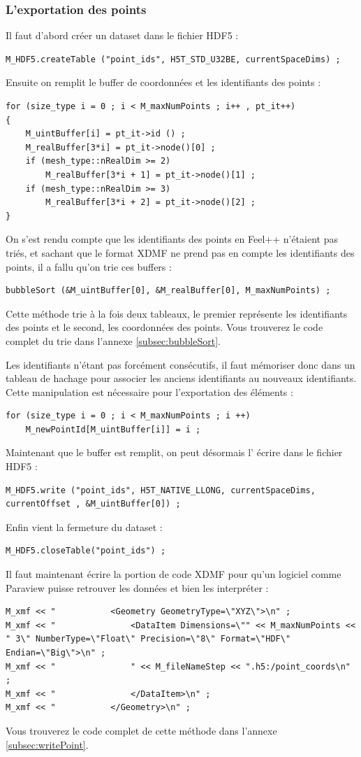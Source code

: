 \documentclass[12pt]{article}
\begin{document}
\subsubsection{L'exportation des points}
\label{subsec:exportationpoint}
\noindent
Il faut d'abord créer un dataset dans le fichier HDF5 :
\begin{lstlisting}
M_HDF5.createTable ("point_ids", H5T_STD_U32BE, currentSpaceDims) ;
\end{lstlisting}
Ensuite on remplit le buffer de coordonnées et les identifiants des points :
\begin{lstlisting}
for (size_type i = 0 ; i < M_maxNumPoints ; i++ , pt_it++) 
{
    M_uintBuffer[i] = pt_it->id () ;
    M_realBuffer[3*i] = pt_it->node()[0] ;
    if (mesh_type::nRealDim >= 2)
        M_realBuffer[3*i + 1] = pt_it->node()[1] ;
    if (mesh_type::nRealDim >= 3)
        M_realBuffer[3*i + 2] = pt_it->node()[2] ;
}
\end{lstlisting}
On s'est rendu compte que les identifiants des points en Feel++ n'étaient pas triés, et sachant que le format XDMF ne prend pas en compte les identifiants des points, il a fallu qu'on trie ces buffers : 
\begin{lstlisting}
bubbleSort (&M_uintBuffer[0], &M_realBuffer[0], M_maxNumPoints) ;
\end{lstlisting}
Cette méthode trie à la fois deux tableaux, le premier représente les identifiants des points et le second, les coordonnées des points.
Vous trouverez le code complet du trie dans l'annexe \ref{subsec:bubbleSort}.

Les identifiants n'étant pas forcément consécutifs, il faut mémoriser donc dans un tableau de hachage pour associer les anciens identifiants au nouveaux identifiants. Cette manipulation est nécessaire pour l'exportation des éléments :
\begin{lstlisting}
for (size_type i = 0 ; i < M_maxNumPoints ; i ++) 
    M_newPointId[M_uintBuffer[i]] = i ;
\end{lstlisting}
Maintenant que le buffer est remplit, on peut désormais l' écrire dans le fichier HDF5 :
\begin{lstlisting}
M_HDF5.write ("point_ids", H5T_NATIVE_LLONG, currentSpaceDims, currentOffset , &M_uintBuffer[0]) ;
\end{lstlisting}
Enfin vient la fermeture du dataset :
\begin{lstlisting}
M_HDF5.closeTable("point_ids") ;
\end{lstlisting}
Il faut maintenant écrire la portion de code XDMF pour qu'un logiciel comme Paraview puisse retrouver les données et bien les interpréter :
\begin{lstlisting}
M_xmf << "           <Geometry GeometryType=\"XYZ\">\n" ;
M_xmf << "               <DataItem Dimensions=\"" << M_maxNumPoints << " 3\" NumberType=\"Float\" Precision=\"8\" Format=\"HDF\" Endian=\"Big\">\n" ;
M_xmf << "               " << M_fileNameStep << ".h5:/point_coords\n" ;
M_xmf << "               </DataItem>\n" ;
M_xmf << "           </Geometry>\n" ;
\end{lstlisting}
Vous trouverez le code complet de cette méthode dans l'annexe \ref{subsec:writePoint}.
\end{document}
